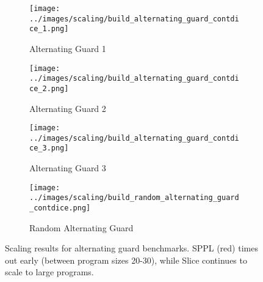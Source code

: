 \begin{figure}[!t]
\centering
\begin{subfigure}{0.48\textwidth}
\texttt{[image: ../images/scaling/build\_alternating\_guard\_contdice\_1.png]}
\caption{Alternating Guard 1}
\end{subfigure}
\hfill
\begin{subfigure}{0.48\textwidth}
\texttt{[image: ../images/scaling/build\_alternating\_guard\_contdice\_2.png]}
\caption{Alternating Guard 2}
\end{subfigure}
\vspace{0.5em}
\begin{subfigure}{0.48\textwidth}
\texttt{[image: ../images/scaling/build\_alternating\_guard\_contdice\_3.png]}
\caption{Alternating Guard 3}
\end{subfigure}
\hfill
\begin{subfigure}{0.48\textwidth}
\texttt{[image: ../images/scaling/build\_random\_alternating\_guard\_contdice.png]}
\caption{Random Alternating Guard}
\end{subfigure}
\caption{Scaling results for alternating guard benchmarks. SPPL (red) times out early (between program sizes 20-30), while Slice continues to scale to large programs.}
\label{fig:alt-benchmarks}
\end{figure}
